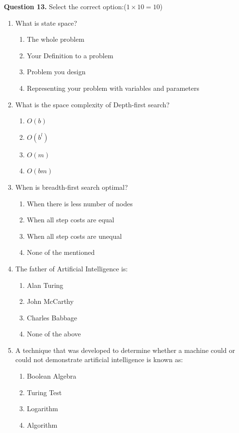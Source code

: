 \documentclass[11pt,a4paper]{article}
\begin{document}
\medskip\noindent\textbf{Question 13.} Select the correct option:\hfill ($1 \times 10 = 10$)
\begin{enumerate}[label=(\roman*),leftmargin=*,itemsep=12pt]
  \item What is state space?
  \begin{enumerate}[label=(\alph*),itemsep=2pt]
    \item The whole problem
    \item Your Definition to a problem
    \item Problem you design
    \item Representing your problem with variables and parameters
  \end{enumerate}
  
  \item What is the space complexity of Depth-first search?
  \begin{enumerate}[label=(\alph*),itemsep=2pt]
    \item $O(b)$
    \item $O(b^l)$
    \item $O(m)$
    \item $O(bm)$
  \end{enumerate}
  
  \item When is breadth-first search optimal?
  \begin{enumerate}[label=(\alph*),itemsep=2pt]
    \item When there is less number of nodes
    \item When all step costs are equal
    \item When all step costs are unequal
    \item None of the mentioned
  \end{enumerate}
  
  \item The father of Artificial Intelligence is:
  \begin{enumerate}[label=(\alph*),itemsep=2pt]
    \item Alan Turing
    \item John McCarthy
    \item Charles Babbage
    \item None of the above
  \end{enumerate}
  
  \item A technique that was developed to determine whether a machine could or could not demonstrate artificial intelligence is known as:
  \begin{enumerate}[label=(\alph*),itemsep=2pt]
    \item Boolean Algebra
    \item Turing Test
    \item Logarithm
    \item Algorithm
  \end{enumerate}
  

\end{enumerate}
\end{document}

